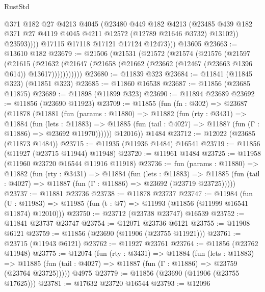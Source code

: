 \begin{lexlean}{RustStd}
\begin{coremodule}
                  @371
                  @182
                  @27
                  @4213
                  @4045
                  (@23480
                    @449
                    @182
                    @4213
                    (@23485
                      @439
                      @182
                      @371
                      @27
                      @4119
                      @4045
                      @4211
                      @12572
                      (@12789 @21646 @3732)
                      @13102))
                  @23593))))
          @17115
          @17118
          @17121
          @17124
          @12473)))
    @13605
@23663 := @13610 @182
@23679 := @21506
    (@21531
      (@21572
        (@21574
          (@21576
            (@21597
              (@21615
                (@21632
                  (@21647 (@21658 (@21662 (@23662 (@12467 (@23663 @1396 @614)) @13617)))))))))))
@23680 := @11839 @323
@23684 := @11841 (@11845 @323) (@11851 @323)
@23685 := @11860 @16538
@23687 := @11856 (@23685 @11875)
@23689 := @11898 (@11899 @323)
@23690 := @11894 @23689
@23692 := @11856 (@23690 @11923)
@23709 := @11855
    (fun (fn : @302) =>
    @23687
      (@11878
        (@11881
          (fun (params : @11880) =>
          @11882
            (fun (rty : @3431) =>
            @11884
              (fun (lets : @11883) =>
              @11885 (fun (tail : @4027) => @11887 (fun (Γ : @11886) => @23692 @11970))))))
        @12016))
    @1484
@23712 := @12022 (@23685 (@11873 @1484))
@23715 := @11935 (@11936 @1484) @16541
@23719 := @11856 (@11927 (@23715 @11944) @11948)
@23720 := @11961 @1484
@23725 := @11958 (@11960 @23720 @16544 @11916 @11918)
@23736 := fun (params : @11880) =>
  @11882
    (fun (rty : @3431) =>
    @11884
      (fun (lets : @11883) =>
      @11885 (fun (tail : @4027) => @11887 (fun (Γ : @11886) => @23692 (@23719 @23725)))))
@23737 := @11881 @23736
@23738 := @11878 @23737
@23747 := @11984
    (fun (U : @11983) => @11985 (fun (t : @7) => @11993 (@11856 (@11999 @16541 @11874) @12010)))
@23750 := @23712 (@23738 @23747) @16539
@23752 := @11841 @23737 @23747
@23754 := @12071 @23736 @6121
@23755 := @11908 @6121
@23759 := @11856 (@23690 (@11906 (@23755 @11921)))
@23761 := @23715 (@11943 @6121)
@23762 := @11927 @23761
@23764 := @11856 (@23762 @11948)
@23775 := @12074
    (fun (rty : @3431) =>
    @11884
      (fun (lets : @11883) =>
      @11885 (fun (tail : @4027) => @11887 (fun (Γ : @11886) => @23759 (@23764 @23725)))))
    @4975
@23779 := @11856 (@23690 (@11906 (@23755 @17625)))
@23781 := @17632 @23720 @16544
@23793 := @12096

\end{coremodule}
\end{lexlean}

